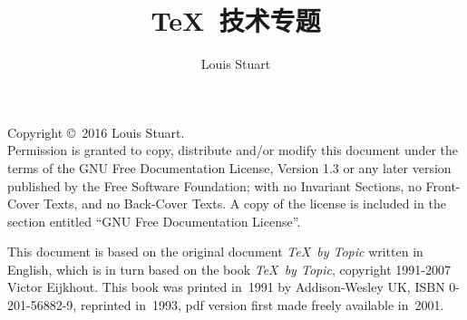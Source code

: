 \documentclass[twoside,letterpaper,no-math]{rapport3}
\title{\TeX\ 技术专题}
\author{Louis Stuart}
\date{}
\begin{document}
\maketitle

Copyright \copyright\ 2016 Louis Stuart.\\
Permission is granted to copy, distribute and/or modify this document
under the terms of the GNU Free Documentation License, Version 1.3
or any later version published by the Free Software Foundation;
with no Invariant Sections, no Front-Cover Texts, and no Back-Cover
Texts.  A copy of the license is included in the section entitled ``GNU
Free Documentation License''.
\par\medskip
This document is based on the original document {\itshape \TeX\ by Topic} written in English, 
which is in turn based on the book {\itshape \TeX\ by Topic},
copyright 1991-2007 Victor Eijkhout. This book was
printed in~1991 by Addison-Wesley UK, ISBN 0-201-56882-9, reprinted
in~1993, pdf version first made freely available in~2001.

\tableofcontents
\end{document}
